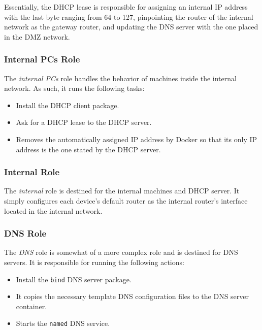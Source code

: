 Essentially, the DHCP lease is responsible for assigning an internal IP address with the last byte ranging from 64 to 127, pinpointing the router of the internal network as the gateway router, and updating the DNS server with the one placed in the DMZ network.

\subsubsection{Internal PCs Role} \label{sec:ansible_internal_pcs_role}

The \textit{internal PCs} role handles the behavior of machines inside the internal network. As such, it runs the following tasks:

\begin{itemize}
    \item Install the DHCP client package.
    \item Ask for a DHCP lease to the DHCP server.
    \item Removes the automatically assigned IP address by Docker so that its only IP address is the one stated by the DHCP server.
\end{itemize}

\subsubsection{Internal Role} \label{sec:ansible_internal_role}

The \textit{internal} role is destined for the internal machines and DHCP server. It simply configures each device's default router as the internal router's interface located in the internal network.

\subsubsection{DNS Role} \label{sec:ansible_dns_role}

The \textit{DNS} role is somewhat of a more complex role and is destined for DNS servers. It is responsible for running the following actions:

\begin{itemize}
    \item Install the \texttt{bind} DNS server package.
    \item It copies the necessary template DNS configuration files to the DNS server container.
    \item Starts the \texttt{named} DNS service.
\end{itemize}

